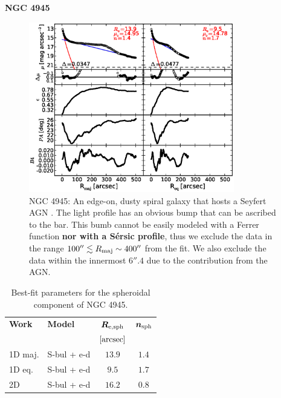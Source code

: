 \documentclass[preprint2]{emulateapj}
\newcommand{\fitfigurewidth}{0.8\textwidth}
\begin{document}
  \clearpage\newpage\noindent
  {\bf NGC 4945 \\}

  \begin{figure}[h]
  \begin{center}
  \includegraphics[width=\fitfigurewidth]{images/n4945_1Dfit.eps}
  \caption{NGC 4945: 
  An edge-on, dusty spiral galaxy that hosts a Seyfert AGN \citep{lin2011}.
  The light profile has an obvious bump that can be ascribed to the bar.
  This bumb cannot be easily modeled with a Ferrer function {\bf nor with a S\'ersic profile}, 
  thus we exclude the data in the range $100'' \lesssim R_{\rm maj} \sim 400''$ from the fit.
  We also exclude the data within the innermost $6''.4$ due to the contribution from the AGN.
  }
  \end{center}
  \end{figure}

  \begin{table}[h]
  \small
  \caption{Best-fit parameters for the spheroidal component of NGC 4945.}
  \begin{center}
  \begin{tabular}{llcc}
  \hline
  {\bf Work} & {\bf Model}   & $\bm R_{\rm e,sph}$    & $\bm n_{\rm sph}$ \\
    &  &  $[\rm arcsec]$ & \\
  \hline
  1D maj. & S-bul + e-d & $13.9$  &  $1.4$ \\
  1D eq.  & S-bul + e-d & $9.5$   &  $1.7$ \\
  2D      & S-bul + e-d & $16.2$  &  $0.8$ \\
  \hline
  \end{tabular}
  \end{center}
  \label{tab:n4945}
  \end{table}
\end{document}
